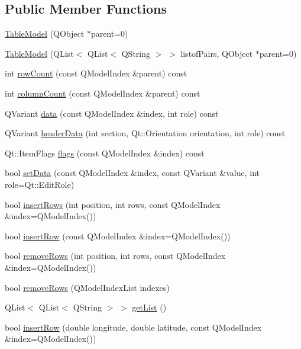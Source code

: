 \subsection*{Public Member Functions}
\begin{DoxyCompactItemize}
\item 
\hyperlink{class_table_model_ad7d9723995888a77fa2242069fe3e67d}{Table\+Model} (Q\+Object $\ast$parent=0)
\item 
\hyperlink{class_table_model_ad91b1c11aa366dc3472fb393c68d0dc8}{Table\+Model} (Q\+List$<$ Q\+List$<$ Q\+String $>$ $>$ listof\+Pairs, Q\+Object $\ast$parent=0)
\item 
int \hyperlink{class_table_model_ac2815f7ad9ece5ffb1abd08a3a567483}{row\+Count} (const Q\+Model\+Index \&parent) const 
\item 
int \hyperlink{class_table_model_a0f07a494fac556e1520b0306c3a50cc0}{column\+Count} (const Q\+Model\+Index \&parent) const 
\item 
Q\+Variant \hyperlink{class_table_model_ab22a19802ca81ba42e1cec670e864183}{data} (const Q\+Model\+Index \&index, int role) const 
\item 
Q\+Variant \hyperlink{class_table_model_a4677a49af807c3b72ca4c1e82971d9ec}{header\+Data} (int section, Qt\+::\+Orientation orientation, int role) const 
\item 
Qt\+::\+Item\+Flags \hyperlink{class_table_model_ac758b15767be92f2ac9e0c4d958d5662}{flags} (const Q\+Model\+Index \&index) const 
\item 
bool \hyperlink{class_table_model_aa5ebe742e8bb1570c2ed8577c41f7c8d}{set\+Data} (const Q\+Model\+Index \&index, const Q\+Variant \&value, int role=Qt\+::\+Edit\+Role)
\item 
bool \hyperlink{class_table_model_a7fcf06eebf32f5295fec05cadcdf5320}{insert\+Rows} (int position, int rows, const Q\+Model\+Index \&index=Q\+Model\+Index())
\item 
bool \hyperlink{class_table_model_a3bc1eb333f87d13d9bb0fb2b4f7c744a}{insert\+Row} (const Q\+Model\+Index \&index=Q\+Model\+Index())
\item 
bool \hyperlink{class_table_model_abd1d9fd2aebf4ab22a5bc1f1bc4c446d}{remove\+Rows} (int position, int rows, const Q\+Model\+Index \&index=Q\+Model\+Index())
\item 
bool \hyperlink{class_table_model_a319fa96b8856ee379b09ddb793611f44}{remove\+Rows} (Q\+Model\+Index\+List indexes)
\item 
Q\+List$<$ Q\+List$<$ Q\+String $>$ $>$ \hyperlink{class_table_model_ac5d306166ddda71a3b2deff4245ff1cf}{get\+List} ()
\item 
bool \hyperlink{class_table_model_a99c2ce0fac13ea5a673f862ea7fe0d6c}{insert\+Row} (double longitude, double latitude, const Q\+Model\+Index \&index=Q\+Model\+Index())
\end{DoxyCompactItemize}



